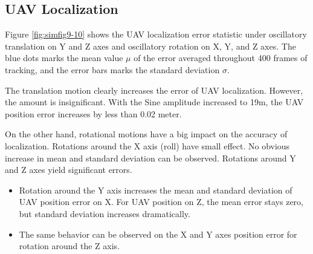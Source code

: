 \subsection{UAV Localization}\label{localization_motion}

Figure \ref{fig:simfig9-10} shows the UAV localization error statistic
under oscillatory translation on Y and Z axes and oscillatory rotation
on X, Y, and Z axes. The blue dots marks the mean value $\mu$ of the
error averaged throughout 400 frames of tracking, and the error bars
marks the standard deviation $\sigma$.

The translation motion clearly increases the error of UAV
localization. However, the amount is insignificant. With the Sine
amplitude increased to 19m, the UAV position error increases by less than
0.02 meter.

On the other hand, rotational motions have a big impact on the accuracy
of localization. Rotations around the X axis (roll) have small effect. No
obvious increase in mean and standard deviation can be
observed. Rotations around Y and Z axes yield significant errors.

\begin{itemize}
  \item Rotation around the Y axis increases the mean and standard deviation
  of UAV position error on X. For UAV position on Z, the mean
  error stays zero, but standard deviation increases dramatically.
  \item The same behavior can be observed on the X and Y axes position
  error for rotation around the Z axis.
\end{itemize}

